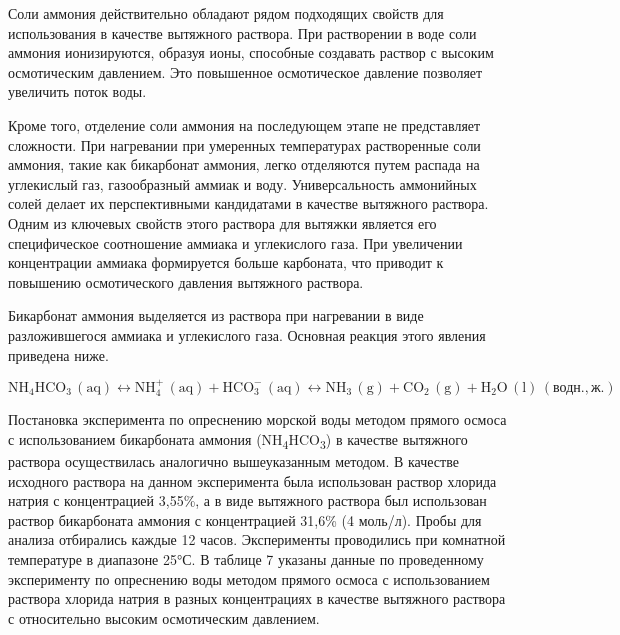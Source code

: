 \begin{multicols}{2}
Соли аммония действительно обладают рядом подходящих свойств для
использования в качестве вытяжного раствора. При растворении в воде соли
аммония ионизируются, образуя ионы, способные создавать раствор с
высоким осмотическим давлением. Это повышенное осмотическое давление
позволяет увеличить поток воды.

Кроме того, отделение соли аммония на последующем этапе не представляет
сложности. При нагревании при умеренных температурах растворенные соли
аммония, такие как бикарбонат аммония, легко отделяются путем распада на
углекислый газ, газообразный аммиак и воду. Универсальность аммонийных
солей делает их перспективными кандидатами в качестве вытяжного
раствора. Одним из ключевых свойств этого раствора для вытяжки является
его специфическое соотношение аммиака и углекислого газа. При увеличении
концентрации аммиака формируется больше карбоната, что приводит к
повышению осмотического давления вытяжного раствора.

Бикарбонат аммония выделяется из раствора при нагревании в виде
разложившегося аммиака и углекислого газа. Основная реакция этого
явления приведена ниже.
\end{multicols}

\begin{equation}
\mathrm{NH_4HCO_3 \, (aq)} \leftrightarrow \mathrm{NH_4^+ \, (aq)} + \mathrm{HCO_3^- \, (aq)} 
\leftrightarrow \mathrm{NH_3 \, (g)} + \mathrm{CO_2 \, (g)} + \mathrm{H_2O \, (l)} \, (\text{водн.}, \text{ж.})
\end{equation}

\begin{multicols}{2}
Постановка эксперимента по опреснению морской воды методом прямого
осмоса с использованием бикарбоната аммония
(NH\textsubscript{4}HCO\textsubscript{3}) в качестве вытяжного раствора
осуществилась аналогично вышеуказанным методом. В качестве исходного
раствора на данном эксперимента была использован раствор хлорида натрия
с концентрацией 3,55\%, а в виде вытяжного раствора был использован
раствор бикарбоната аммония с концентрацией 31,6\% (4 моль/л). Пробы для
анализа отбирались каждые 12 часов. Эксперименты проводились при
комнатной температуре в диапазоне 25°С. В таблице 7 указаны данные по
проведенному эксперименту по опреснению воды методом прямого осмоса с
использованием раствора хлорида натрия в разных концентрациях в качестве
вытяжного раствора с относительно высоким осмотическим давлением.
\end{multicols}

